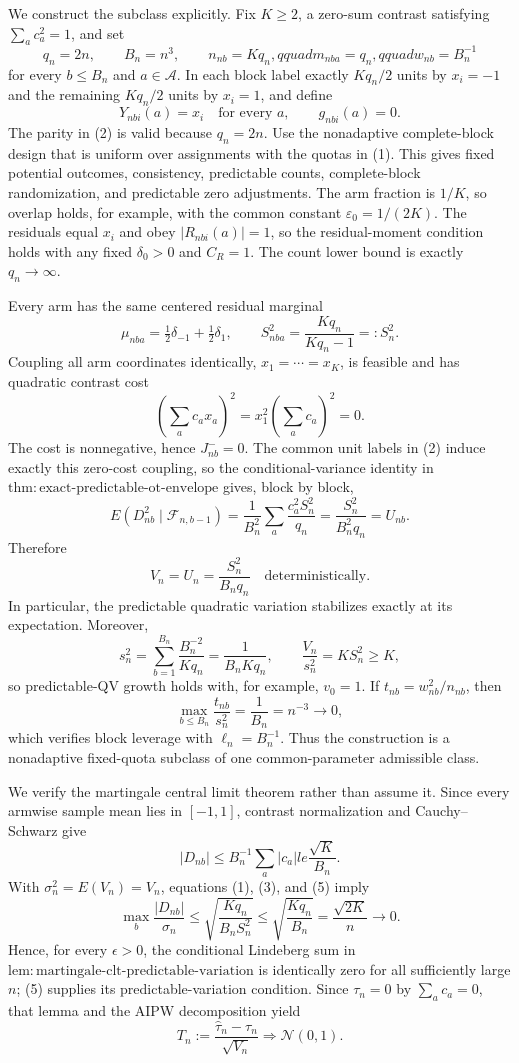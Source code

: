 We construct the subclass explicitly. Fix \(K\ge2\), a zero-sum contrast satisfying \(\sum_ac_a^2=1\), and set
\[
q_n=2n,\qquad B_n=n^3,
\qquad n_{nb}=Kq_n,qquad m_{nba}=q_n,qquad w_{nb}=B_n^{-1}
\tag{1}
\]
for every \(b\le B_n\) and \(a\in\mathcal A\). In each block label exactly \(Kq_n/2\) units by \(x_i=-1\) and the remaining \(Kq_n/2\) units by \(x_i=1\), and define
\[
Y_{nbi}(a)=x_i\quad\text{for every }a,
\qquad g_{nbi}(a)=0.
\tag{2}
\]
The parity in (2) is valid because \(q_n=2n\). Use the nonadaptive complete-block design that is uniform over assignments with the quotas in (1). This gives fixed potential outcomes, consistency, predictable counts, complete-block randomization, and predictable zero adjustments. The arm fraction is \(1/K\), so overlap holds, for example, with the common constant \(\varepsilon_0=1/(2K)\). The residuals equal \(x_i\) and obey \(|R_{nbi}(a)|=1\), so the residual-moment condition holds with any fixed \(\delta_0>0\) and \(C_R=1\). The count lower bound is exactly \(q_n\to\infty\).

Every arm has the same centered residual marginal
\[
\mu_{nba}=\tfrac12\delta_{-1}+\tfrac12\delta_1,
\qquad S_{nba}^2=\frac{Kq_n}{Kq_n-1}=:S_n^2.
\tag{3}
\]
Coupling all arm coordinates identically, \(x_1=\cdots=x_K\), is feasible and has quadratic contrast cost
\[
\left(\sum_ac_ax_a\right)^2=x_1^2\left(\sum_ac_a\right)^2=0.
\]
The cost is nonnegative, hence \(J_{nb}^{-}=0\). The common unit labels in (2) induce exactly this zero-cost coupling, so the conditional-variance identity in \(\mathrm{thm:exact\text{-}predictable\text{-}ot\text{-}envelope}\) gives, block by block,
\[
E(D_{nb}^2\mid\mathcal F_{n,b-1})
=\frac1{B_n^2}\sum_a\frac{c_a^2S_n^2}{q_n}
=\frac{S_n^2}{B_n^2q_n}=U_{nb}.
\tag{4}
\]
Therefore
\[
V_n=U_n=\frac{S_n^2}{B_nq_n}
\quad\text{deterministically}.
\tag{5}
\]
In particular, the predictable quadratic variation stabilizes exactly at its expectation. Moreover,
\[
s_n^2=\sum_{b=1}^{B_n}\frac{B_n^{-2}}{Kq_n}
=\frac1{B_nKq_n},
\qquad
\frac{V_n}{s_n^2}=KS_n^2\ge K,
\tag{6}
\]
so predictable-QV growth holds with, for example, \(v_0=1\). If \(t_{nb}=w_{nb}^2/n_{nb}\), then
\[
\max_{b\le B_n}\frac{t_{nb}}{s_n^2}=\frac1{B_n}=n^{-3}\longrightarrow0,
\tag{7}
\]
which verifies block leverage with \(\ell_n=B_n^{-1}\). Thus the construction is a nonadaptive fixed-quota subclass of one common-parameter admissible class.

We verify the martingale central limit theorem rather than assume it. Since every armwise sample mean lies in \([-1,1]\), contrast normalization and Cauchy--Schwarz give
\[
|D_{nb}|\le B_n^{-1}\sum_a|c_a|le\frac{\sqrt K}{B_n}.
\tag{8}
\]
With \(\sigma_n^2=E(V_n)=V_n\), equations (1), (3), and (5) imply
\[
\max_b\frac{|D_{nb}|}{\sigma_n}
\le\sqrt{\frac{Kq_n}{B_nS_n^2}}
\le\sqrt{\frac{Kq_n}{B_n}}
=\frac{\sqrt{2K}}{n}\longrightarrow0.
\tag{9}
\]
Hence, for every \(\epsilon>0\), the conditional Lindeberg sum in \(\mathrm{lem:martingale\text{-}clt\text{-}predictable\text{-}variation}\) is identically zero for all sufficiently large \(n\); (5) supplies its predictable-variation condition. Since \(\tau_n=0\) by \(\sum_ac_a=0\), that lemma and the AIPW decomposition yield
\[
T_n:=\frac{\widehat\tau_n-\tau_n}{\sqrt{V_n}}
\Rightarrow\mathcal N(0,1).
\tag{10}
\]

